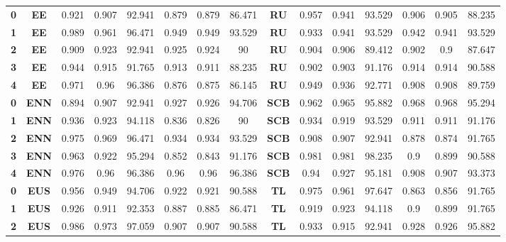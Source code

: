 {{\begin{tabular}{c|c|cccccc|ccccccc}
\textbf{0} & \textbf{EE} & 0.921 & 0.907 & 92.941 & 0.879 & 0.879 & 86.471 & \multicolumn{1}{c|}{\textbf{RU}} & 0.957 & 0.941 & 93.529 & 0.906 & 0.905 & 88.235 \\
\textbf{1} & \textbf{EE} & 0.989 & 0.961 & 96.471 & 0.949 & 0.949 & 93.529 & \multicolumn{1}{c|}{\textbf{RU}} & 0.933 & 0.941 & 93.529 & 0.942 & 0.941 & 93.529 \\
\textbf{2} & \textbf{EE} & 0.909 & 0.923 & 92.941 & 0.925 & 0.924 & 90    & \multicolumn{1}{c|}{\textbf{RU}} & 0.904 & 0.906 & 89.412 & 0.902 & 0.9   & 87.647 \\
\textbf{3} & \textbf{EE} & 0.944 & 0.915 & 91.765 & 0.913 & 0.911 & 88.235 & \multicolumn{1}{c|}{\textbf{RU}} & 0.902 & 0.903 & 91.176 & 0.914 & 0.914 & 90.588 \\
\textbf{4} & \textbf{EE} & 0.971 & 0.96  & 96.386 & 0.876 & 0.875 & 86.145 & \multicolumn{1}{c|}{\textbf{RU}} & 0.949 & 0.936 & 92.771 & 0.908 & 0.908 & 89.759 \\
\textbf{0} & \textbf{ENN} & 0.894 & 0.907 & 92.941 & 0.927 & 0.926 & 94.706 & \multicolumn{1}{c|}{\textbf{SCB}} & 0.962 & 0.965 & 95.882 & 0.968 & 0.968 & 95.294 \\
\textbf{1} & \textbf{ENN} & 0.936 & 0.923 & 94.118 & 0.836 & 0.826 & 90    & \multicolumn{1}{c|}{\textbf{SCB}} & 0.934 & 0.919 & 93.529 & 0.911 & 0.911 & 91.176 \\
\textbf{2} & \textbf{ENN} & 0.975 & 0.969 & 96.471 & 0.934 & 0.934 & 93.529 & \multicolumn{1}{c|}{\textbf{SCB}} & 0.908 & 0.907 & 92.941 & 0.878 & 0.874 & 91.765 \\
\textbf{3} & \textbf{ENN} & 0.963 & 0.922 & 95.294 & 0.852 & 0.843 & 91.176 & \multicolumn{1}{c|}{\textbf{SCB}} & 0.981 & 0.981 & 98.235 & 0.9   & 0.899 & 90.588 \\
\textbf{4} & \textbf{ENN} & 0.976 & 0.96  & 96.386 & 0.96  & 0.96  & 96.386 & \multicolumn{1}{c|}{\textbf{SCB}} & 0.94  & 0.927 & 95.181 & 0.908 & 0.907 & 93.373 \\
\textbf{0} & \textbf{EUS} & 0.956 & 0.949 & 94.706 & 0.922 & 0.921 & 90.588 & \multicolumn{1}{c|}{\textbf{TL}} & 0.975 & 0.961 & 97.647 & 0.863 & 0.856 & 91.765 \\
\textbf{1} & \textbf{EUS} & 0.926 & 0.911 & 92.353 & 0.887 & 0.885 & 86.471 & \multicolumn{1}{c|}{\textbf{TL}} & 0.919 & 0.923 & 94.118 & 0.9   & 0.899 & 91.765 \\
\textbf{2} & \textbf{EUS} & 0.986 & 0.973 & 97.059 & 0.907 & 0.907 & 90.588 & \multicolumn{1}{c|}{\textbf{TL}} & 0.933 & 0.915 & 92.941 & 0.928 & 0.926 & 95.882 \\

\end{tabular}}}
